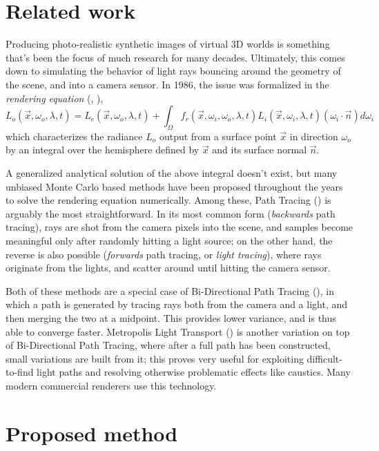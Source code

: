 \documentclass[12pt,a4paper]{article}
\begin{document}
\section{Related work}

Producing photo-realistic synthetic images of virtual 3D worlds is something that's been the focus of much research for many decades. Ultimately, this comes down to simulating the behavior of light rays bouncing around the geometry of the scene, and into a camera sensor. In 1986, the issue was formalized in the \textit{rendering equation} (\cite{10.1145/15886.15901}, \cite{10.1145/15886.15902}),
$$L_o(\vec{x}, \omega_o, \lambda, t)=L_e(\vec{x}, \omega_o, \lambda, t)+\int_{\Omega}f_r(\vec{x}, \omega_i, \omega_o, \lambda, t)L_i(\vec{x}, \omega_i, \lambda, t)(\omega_i \cdot \vec{n}) d\omega_i$$
which characterizes the radiance $L_o$ output from a surface point $\vec{x}$ in direction $\omega_o$ by an integral over the hemisphere defined by $\vec{x}$ and its surface normal $\vec{n}$.

A generalized analytical solution of the above integral doesn't exist, but many unbiased Monte Carlo based methods have been proposed throughout the years to solve the rendering equation numerically. Among these, Path Tracing (\cite{10.1145/15886.15902}) is arguably the most straightforward. In its most common form (\textit{backwards} path tracing), rays are shot from the camera pixels into the scene, and samples become meaningful only after randomly hitting a light source; on the other hand, the reverse is also possible (\textit{forwards} path tracing, or \textit{light tracing}), where rays originate from the lights, and scatter around until hitting the camera sensor.

Both of these methods are a special case of Bi-Directional Path Tracing (\cite{bidir}), in which a path is generated by tracing rays both from the camera and a light, and then merging the two at a midpoint. This provides lower variance, and is thus able to converge faster. Metropolis Light Transport (\cite{10.1145/258734.258775}) is another variation on top of Bi-Directional Path Tracing, where after a full path has been constructed, small variations are built from it; this proves very useful for exploiting difficult-to-find light paths and resolving otherwise problematic effects like caustics. Many modern commercial renderers use this technology.

\section{Proposed method}
\end{document}
